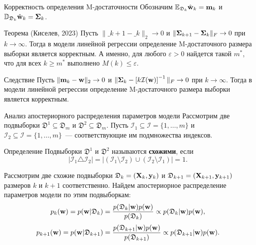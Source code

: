 \documentclass[10pt]{beamer}
\begin{document}
\begin{frame}{Корректность определения M-достаточности}
    Обозначим $\mathbb{E}_{\mathfrak{D}_k}\hat{\mathbf{w}}_k = \mathbf{m}_k$ и $\mathbb{D}_{\mathfrak{D}_k}\hat{\mathbf{w}}_k = \boldsymbol{\Sigma}_k$.
    \vfill
    \begin{block}{Теорема (Киселев, 2023)}
        Пусть $\| \bm_{k+1} - \bm_k \|_2 \to 0$ и $\| \boldsymbol{\Sigma}_{k+1} - \boldsymbol{\Sigma}_k \|_{F} \to 0$ при $k \to \infty$. Тогда в модели линейной регрессии определение M-достаточного размера выборки является корректным. А именно, для любого $\varepsilon > 0$ найдется такой $m^*$, что для всех $k \geqslant m^*$ выполнено $M(k) \leqslant \varepsilon$.
    \end{block}
    \vfill
    \begin{block}{Следствие}
        Пусть $\| \mathbf{m}_k - \mathbf{w} \|_2 \to 0$ и $\| \boldsymbol{\Sigma}_k - \left[k\mathcal{I}(\mathbf{w})\right]^{-1} \|_{F} \to 0$ при $k \to \infty$. Тогда в модели линейной регрессии определение M-достаточного размера выборки является корректным. 
    \end{block}
\end{frame}
\begin{frame}{Анализ апостериорного распределения параметров модели}
    Рассмотрим две подвыборки $\mathfrak{D}^1 \subseteq \mathfrak{D}_m$ и $\mathfrak{D}^2 \subseteq \mathfrak{D}_m$. Пусть $\mathcal{I}_1 \subseteq \mathcal{I} = \{ 1, \ldots, m \}$ и $\mathcal{I}_2 \subseteq \mathcal{I} = \{ 1, \ldots, m \}$~--- соответствующие им подмножества индексов.
    \vfill
    \begin{block}{Определение}
        Подвыборки $\mathfrak{D}^1$ и $\mathfrak{D}^2$ называются \textbf{схожими}, если
        \[ \left| \mathcal{I}_1 \triangle \mathcal{I}_2 \right| = \left| \left( \mathcal{I}_1 \setminus \mathcal{I}_2 \right) \cup \left( \mathcal{I}_2 \setminus \mathcal{I}_1 \right) \right| = 1. \]
    \end{block}
    \vfill
    Рассмотрим две схожие подвыборки $\mathfrak{D}_k = (\mathbf{X}_k, \mathbf{y}_k)$ и $\mathfrak{D}_{k+1} = (\mathbf{X}_{k+1}, \mathbf{y}_{k+1})$ размеров $k$ и $k+1$ соответственно. Найдем апостериорное распределение параметров модели по этим подвыборкам:
    \[ p_k(\mathbf{w}) = p(\mathbf{w} | \mathfrak{D}_k) = \dfrac{p(\mathfrak{D}_k | \mathbf{w}) p(\mathbf{w})}{p(\mathfrak{D}_k)} \propto p(\mathfrak{D}_k | \mathbf{w}) p(\mathbf{w}), \]
    \[ p_{k+1}(\mathbf{w}) = p(\mathbf{w} | \mathfrak{D}_{k+1}) = \dfrac{p(\mathfrak{D}_{k+1} | \mathbf{w}) p(\mathbf{w})}{p(\mathfrak{D}_{k+1})} \propto p(\mathfrak{D}_{k+1} | \mathbf{w}) p(\mathbf{w}). \]
\end{frame}
\end{document}
